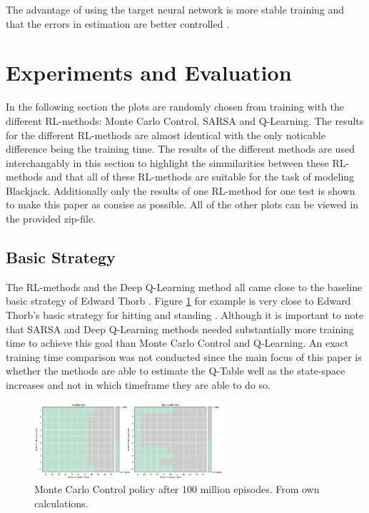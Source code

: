 \documentclass[conference]{IEEEtran}
\begin{document}
The advantage of using the target neural network is more stable training and that the errors in estimation are better controlled \cite{b6}.



\section{Experiments and Evaluation}
In the following section the plots are randomly chosen from training with the different RL-methods: Monte Carlo Control, SARSA and Q-Learning. 
The results for the different RL-methods are almost identical with the only noticable difference being the training time.  
The results of the different methods are used interchangably in this section to highlight the simmilarities between these RL-methods and that all of these RL-methods are suitable for the task of modeling Blackjack. 
Additionally only the results of one RL-method for one test is shown to make this paper as consise as possible. 
All of the other plots can be viewed in the provided zip-file.

\subsection{Basic Strategy}
The RL-methods and the Deep Q-Learning method all came close to the baseline basic strategy of Edward Thorb \cite{b1}.
Figure \ref{fig:monte-carlo-basic-strategy} for example is very close to Edward Thorb's basic strategy for hitting and standing \cite{b1}. 
Although it is important to note that SARSA and Deep Q-Learning  methods needed substantially more training time to achieve this goal than Monte Carlo Control and Q-Learning. 
An exact training time comparison was not conducted since the main focus of this paper is whether the methods are able to estimate the Q-Table well as the state-space increases and not in which timeframe they are able to do so.

\begin{figure}
	\centering
	\includegraphics[width=70mm]{figures/MC/basic-100-million/policy.png}
	\caption{Monte Carlo Control policy after 100 million episodes. From own calculations.}
	\label{fig:monte-carlo-basic-strategy}
\end{figure}
\end{document}
